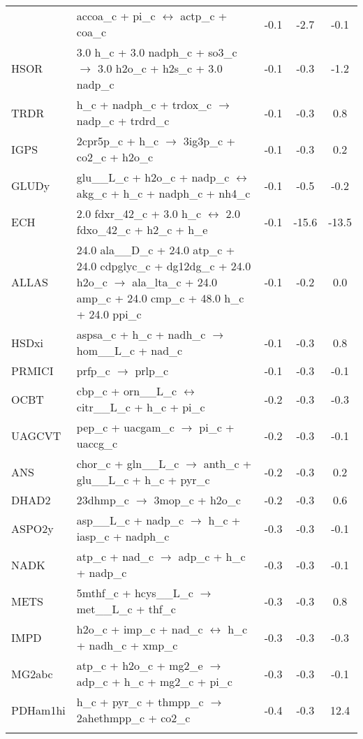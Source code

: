 \begin{longtable}{lp{}ccc}
{PTAr	&	accoa\_c + pi\_c $\leftrightarrow$ actp\_c + coa\_c	&	-0.1	&	-2.7	&	-0.1	\\
HSOR	&	3.0 h\_c + 3.0 nadph\_c + so3\_c $\rightarrow$ 3.0 h2o\_c + h2s\_c + 3.0 nadp\_c	&	-0.1	&	-0.3	&	-1.2	\\
TRDR	&	h\_c + nadph\_c + trdox\_c $\rightarrow$ nadp\_c + trdrd\_c	&	-0.1	&	-0.3	&	0.8	\\
IGPS	&	2cpr5p\_c + h\_c $\rightarrow$ 3ig3p\_c + co2\_c + h2o\_c	&	-0.1	&	-0.3	&	0.2	\\
GLUDy	&	glu\_\_L\_c + h2o\_c + nadp\_c $\leftrightarrow$ akg\_c + h\_c + nadph\_c + nh4\_c	&	-0.1	&	-0.5	&	-0.2	\\
ECH	&	2.0 fdxr\_42\_c + 3.0 h\_c $\leftrightarrow$ 2.0 fdxo\_42\_c + h2\_c + h\_e	&	-0.1	&	-15.6	&	-13.5	\\
ALLAS	&	24.0 ala\_\_D\_c + 24.0 atp\_c + 24.0 cdpglyc\_c + dg12dg\_c + 24.0 h2o\_c $\rightarrow$ ala\_lta\_c + 24.0 amp\_c + 24.0 cmp\_c + 48.0 h\_c + 24.0 ppi\_c	&	-0.1	&	-0.2	&	0.0	\\
HSDxi	&	aspsa\_c + h\_c + nadh\_c $\rightarrow$ hom\_\_L\_c + nad\_c	&	-0.1	&	-0.3	&	0.8	\\
PRMICI	&	prfp\_c $\rightarrow$ prlp\_c	&	-0.1	&	-0.3	&	-0.1	\\
OCBT	&	cbp\_c + orn\_\_L\_c $\leftrightarrow$ citr\_\_L\_c + h\_c + pi\_c	&	-0.2	&	-0.3	&	-0.3	\\
UAGCVT	&	pep\_c + uacgam\_c $\rightarrow$ pi\_c + uaccg\_c	&	-0.2	&	-0.3	&	-0.1	\\
ANS	&	chor\_c + gln\_\_L\_c $\rightarrow$ anth\_c + glu\_\_L\_c + h\_c + pyr\_c	&	-0.2	&	-0.3	&	0.2	\\
DHAD2	&	23dhmp\_c $\rightarrow$ 3mop\_c + h2o\_c	&	-0.2	&	-0.3	&	0.6	\\
ASPO2y	&	asp\_\_L\_c + nadp\_c $\rightarrow$ h\_c + iasp\_c + nadph\_c	&	-0.3	&	-0.3	&	-0.1	\\
NADK	&	atp\_c + nad\_c $\rightarrow$ adp\_c + h\_c + nadp\_c	&	-0.3	&	-0.3	&	-0.1	\\
METS	&	5mthf\_c + hcys\_\_L\_c $\rightarrow$ met\_\_L\_c + thf\_c	&	-0.3	&	-0.3	&	0.8	\\
IMPD	&	h2o\_c + imp\_c + nad\_c $\leftrightarrow$ h\_c + nadh\_c + xmp\_c	&	-0.3	&	-0.3	&	-0.3	\\
MG2abc	&	atp\_c + h2o\_c + mg2\_e $\rightarrow$ adp\_c + h\_c + mg2\_c + pi\_c	&	-0.3	&	-0.3	&	-0.1	\\
PDHam1hi	&	h\_c + pyr\_c + thmpp\_c $\rightarrow$ 2ahethmpp\_c + co2\_c	&	-0.4	&	-0.3	&	12.4	\\
}
\end{longtable}

